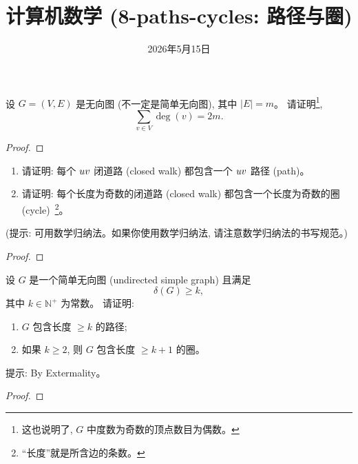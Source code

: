 \documentclass[a4paper, justified]{tufte-handout}
\title{计算机数学 (8-paths-cycles: 路径与圈)}
\date{2026年5月15日}
\begin{document}
\maketitle
\noplagiarism %
\begin{abstract}
\end{abstract}
\beginrequired

\begin{problem}
  设 $G = (V, E)$ 是无向图 (不一定是简单无向图),
  其中 $|E| = m$。
  请证明\footnote{这也说明了, $G$ 中度数为奇数的顶点数目为偶数。},
  \[
    \sum_{v \in V} \deg(v) = 2m.
  \]
\end{problem}

\begin{proof}
\end{proof}

\begin{problem}
  \begin{enumerate}[(1)]
    \item 请证明: 每个 $u\-v$ 闭道路 (closed walk) 都包含一个 $u\-v$ 路径 (path)。
    \item 请证明: 每个长度为奇数的闭道路 (closed walk) 都包含一个长度为奇数的圈 (cycle)~\footnote{
    ``长度''就是所含边的条数。}。
  \end{enumerate}

  \vspace{1em}
  \noindent (提示: 可用数学归纳法。如果你使用数学归纳法, 请注意数学归纳法的书写规范。)
\end{problem}

\begin{proof}
\end{proof}

\begin{problem}
  设 $G$ 是一个简单无向图 (undirected simple graph) 且满足
  \[
    \delta(G) \ge k,
  \]
  其中 $k \in \mathbb{N}^{+}$ 为常数。
  请证明:
  \begin{enumerate}[(1)]
    \item $G$ 包含长度 $\ge k$ 的路径;
    \item 如果 $k \ge 2$, 则 $G$ 包含长度 $\ge k + 1$ 的圈。
  \end{enumerate}
  提示: By Extermality。
\end{problem}

\begin{proof}
\end{proof}
\end{document}
